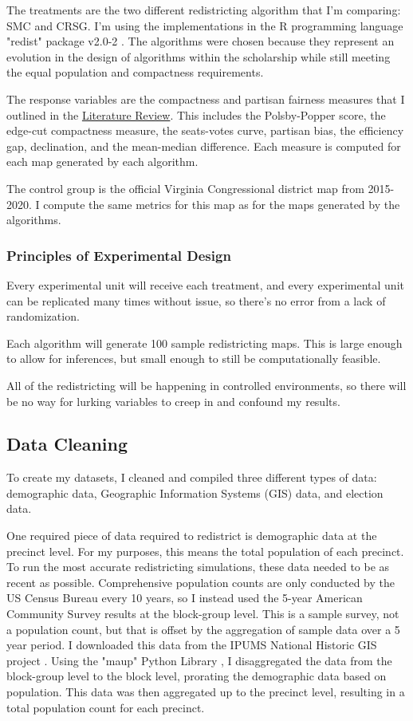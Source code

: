 The treatments  are the two different redistricting algorithm that I'm comparing: SMC and CRSG. I'm using the implementations in the R programming language "redist" package v2.0-2 \parencite{fifield2020d}. The algorithms were chosen because they represent an evolution in the design of algorithms within the scholarship while still meeting the equal population and compactness requirements.

The response variables are the compactness and partisan fairness measures that I outlined in the \hyperref[sec:litreview]{Literature Review}. This includes the Polsby-Popper score, the edge-cut compactness measure, the seats-votes curve, partisan bias, the efficiency gap, declination, and the mean-median difference. Each measure is computed for each map generated by each algorithm.

The control group is the official Virginia Congressional district map from 2015-2020. I compute the same metrics for this map as for the maps generated by the algorithms.

\subsubsection{Principles of Experimental Design}

Every experimental unit will receive each treatment, and every experimental unit can be replicated many times without issue, so there's no error from a lack of randomization. 

Each algorithm will generate 100 sample redistricting maps. This is large enough to allow for inferences, but small enough to still be computationally feasible. 

All of the redistricting will be happening in controlled environments, so there will be no way for lurking variables to creep in and confound my results. 

\subsection{Data Cleaning}

To create my datasets, I cleaned and compiled three different types of data: demographic data, Geographic Information Systems (GIS) data, and election data.

One required piece of data required to redistrict is demographic data at the precinct level. For my purposes, this means the total population of each precinct. To run the most accurate redistricting simulations, these data needed to be as recent as possible. Comprehensive population counts are only conducted by the US Census Bureau every 10 years, so I instead used the 5-year American Community Survey results at the block-group level. This is a sample survey, not a population count, but that is offset by the aggregation of sample data over a 5 year period. I downloaded this data from the IPUMS National Historic GIS project \parencite{mansonsteven2020}. Using the "maup" Python Library \parencite{hully2020}, I disaggregated the data from the block-group level to the block level, prorating the demographic data based on population. This data was then aggregated up to the precinct level, resulting in a total population count for each precinct.

